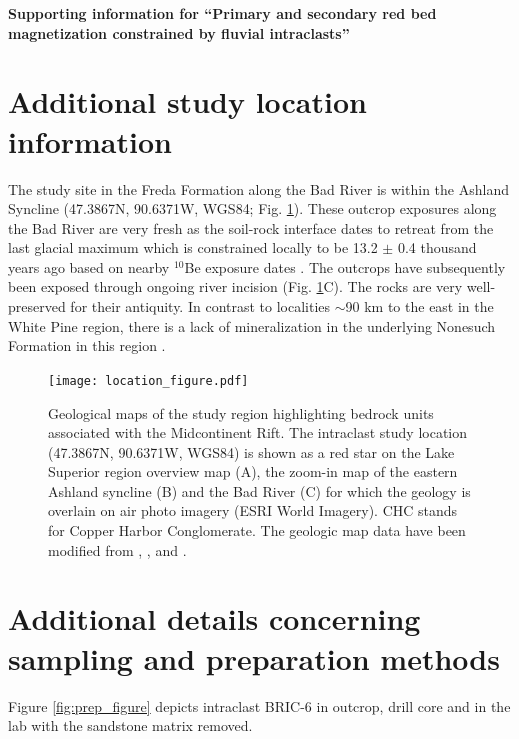 \documentclass[11pt,letterpaper]{article}
\begin{document}
\begin{flushleft}
{\Large \textbf{Supporting information for ``Primary and secondary red bed magnetization constrained by fluvial intraclasts''}}

\end{flushleft}

\section*{Additional study location information}
The study site in the Freda Formation along the Bad River is within the Ashland Syncline (47.3867\textdegree N, 90.6371\textdegree W, WGS84; Fig. \ref{fig:location_figure}). These outcrop exposures along the Bad River are very fresh as the soil-rock interface dates to retreat from the last glacial maximum which is constrained locally to be 13.2 $\pm$ 0.4 thousand years ago based on nearby $^{10}$Be exposure dates \citep{Ullman2015a}. The outcrops have subsequently been exposed through ongoing river incision (Fig. \ref{fig:location_figure}C). The rocks are very well-preserved for their antiquity. In contrast to localities $\sim$90 km to the east in the White Pine region, there is a lack of mineralization in the underlying Nonesuch Formation in this region \citep{Stewart2017a}. 

\begin{figure}[!ht]
\noindent\texttt{[image: location\_figure.pdf]}
\caption{\small{Geological maps of the study region highlighting bedrock units associated with the Midcontinent Rift. The intraclast study location (47.3867\textdegree N, 90.6371\textdegree W, WGS84) is shown as a red star on the Lake Superior region overview map (A), the zoom-in map of the eastern Ashland syncline (B) and the Bad River (C) for which the geology is overlain on air photo imagery (ESRI World Imagery). CHC stands for Copper Harbor Conglomerate. The geologic map data have been modified from \cite{Survey2011a}, \cite{Nicholson2004a}, and \cite{Jirsa2011a}.}}
\label{fig:location_figure}
\end{figure} 

\section*{Additional details concerning sampling and preparation methods}

Figure \ref{fig:prep_figure} depicts intraclast BRIC-6 in outcrop, drill core and in the lab with the sandstone matrix removed.
\end{document}
